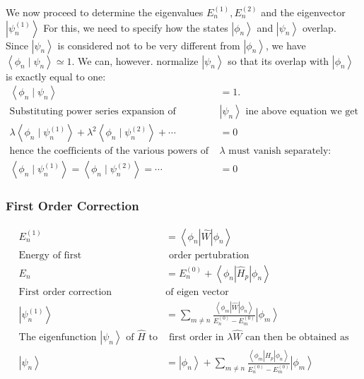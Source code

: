 We now proceed to determine the eigenvalues $E_{n}^{(1)}, E_{n}^{(2)}$ and the eigenvector $\left|\psi_{n}^{(1)}\right\rangle$  For this, we need to specify how the states $\left|\phi_{n}\right\rangle$ and $\left|\psi_{n}\right\rangle$ overlap. Since $\left|\psi_{n}\right\rangle$ is considered not to be very different from $\left|\phi_{n}\right\rangle$, we have $\left\langle\phi_{n} \mid \psi_{n}\right\rangle \simeq 1 .$ We can, however. normalize $\left|\psi_{n}\right\rangle$ so that its overlap with $\left|\phi_{n}\right\rangle$ is exactly equal to one:
\begin{align*}
\left\langle\phi_{n} \mid \psi_{n}\right\rangle&=1 .\\
\text{Substituting power series expansion of }&\text{$\left|\psi_{n}\right\rangle $ ine above equation we get}\\
\lambda\left\langle\phi_{n} \mid \psi_{n}^{(1)}\right\rangle+\lambda^{2}\left\langle\phi_{n} \mid \psi_{n}^{(2)}\right\rangle+\cdots&=0\\
\text{hence the coefficients of the various powers of }&\text{$\lambda$ must vanish separately:}\\
\left\langle\phi_{n} \mid \psi_{n}^{(1)}\right\rangle=\left\langle\phi_{n} \mid \psi_{n}^{(2)}\right\rangle=\cdots&=0 
\end{align*}
\subsubsection{First Order Correction}
\begin{align*}
E_{n}^{(1)}&=\left\langle\phi_{n}|\hat{W}| \phi_{n}\right\rangle\\
\text{Energy of first}&\text{ order pertubration}\\
E_{n}&=E_{n}^{(0)}+\left\langle\phi_{n}\left|\hat{H}_{p}\right| \phi_{n}\right\rangle\\
\text{First order correction }&\text{of eigen vector}\\
\left|\psi_{n}^{(1)}\right\rangle&=\sum_{m \neq n} \frac{\left\langle\phi_{m}|\hat{W}| \phi_{n}\right\rangle}{E_{n}^{(0)}-E_{m}^{(0)}}\left|\phi_{m}\right\rangle\\
\text{The eigenfunction $\left|\psi_{n}\right\rangle$ of $\hat{H}$ to}&\text{ first order in $\lambda \hat{W}$ can then be obtained as}\\
\left|\psi_{n}\right\rangle&=\left|\phi_{n}\right\rangle+\sum_{m \neq n} \frac{\left\langle\phi_{m}\left|\hat{H}_{p}\right| \phi_{n}\right\rangle}{E_{n}^{(0)}-E_{m}^{(0)}}\left|\phi_{m}\right\rangle
\end{align*}
